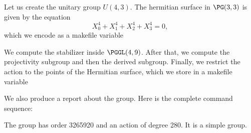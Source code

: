 Let us create the unitary group $U(4,3).$
The hermitian surface in $\PG(3,3)$ is given by the equation
$$
X_0^4+X_1^4+X_2^4+X_3^4=0,
$$
which we encode as a makefile variable


We compute the stabilizer inside $\PGGL(4,9)$. 
After that, we compute the projectivity subgroup and then the derived subgroup. 
Finally, we restrict the action to the points of the Hermitian surface, 
which we store in a makefile variable



We also produce a report about the group.
Here is the complete command sequence:


The group has order 3265920 and an action of degree 280. It is a simple group. 


\bigskip








